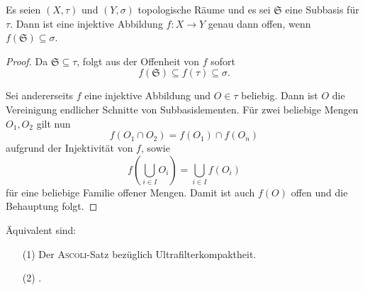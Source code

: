 \begin{lem}
  \label{lem:openmap}
  Es seien $(X,\tau)$ und $(Y,\sigma)$ topologische Räume und es sei $\mathfrak{S}$ eine Subbasis für $\tau$.  
  Dann ist eine injektive Abbildung $f \colon X \to Y$ genau dann offen, wenn $f(\mathfrak{S}) \subseteq \sigma$.
\end{lem}

\begin{proof}
  Da $\mathfrak{S} \subseteq \tau$, folgt aus der Offenheit von $f$ sofort 
  \begin{displaymath}
    f(\mathfrak{S}) \subseteq f(\tau) \subseteq \sigma.
  \end{displaymath}

  Sei andererseits $f$ eine injektive Abbildung und $O \in \tau$ beliebig.
  Dann ist $O$ die Vereinigung endlicher Schnitte von Subbasislementen.
  Für zwei beliebige Mengen $O_1,O_2$ gilt nun 
  \begin{displaymath}
    f(O_1 \cap O_2) = f(O_1) \cap f(O_n)
  \end{displaymath}
  aufgrund der Injektivität von $f$, sowie 
  \begin{displaymath}
    f \left(\bigcup_{i \in I} O_i \right) = \bigcup_{i \in I} f(O_i)
  \end{displaymath}
  für eine beliebige Familie offener Mengen.
  Damit ist auch $f(O)$ offen und die Behauptung folgt.
\end{proof}

\begin{thm}
  \label{thm:ultrafiltercompact}
  Äquivalent sind:
  \begin{enumerate}
    \item[(1)] Der \textsc{Ascoli}-Satz bezüglich Ultrafilterkompaktheit.
    \item[(2)] \PIT.
  \end{enumerate}
\end{thm}

